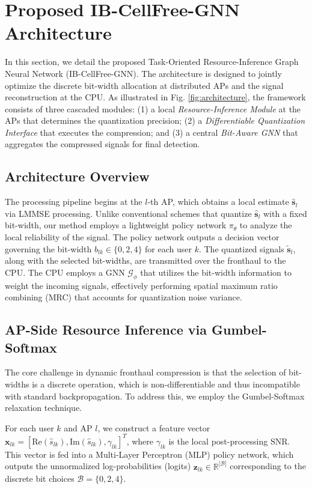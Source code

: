 \section{Proposed IB-CellFree-GNN Architecture}

In this section, we detail the proposed Task-Oriented Resource-Inference Graph Neural Network (IB-CellFree-GNN). The architecture is designed to jointly optimize the discrete bit-width allocation at distributed APs and the signal reconstruction at the CPU. As illustrated in Fig. \ref{fig:architecture}, the framework consists of three cascaded modules: (1) a local \textit{Resource-Inference Module} at the APs that determines the quantization precision; (2) a \textit{Differentiable Quantization Interface} that executes the compression; and (3) a central \textit{Bit-Aware GNN} that aggregates the compressed signals for final detection.

\subsection{Architecture Overview}
The processing pipeline begins at the $l$-th AP, which obtains a local estimate $\hat{\mathbf{s}}_l$ via LMMSE processing. Unlike conventional schemes that quantize $\hat{\mathbf{s}}_l$ with a fixed bit-width, our method employs a lightweight policy network $\pi_{\theta}$ to analyze the local reliability of the signal. The policy network outputs a decision vector governing the bit-width $b_{lk} \in \{0, 2, 4\}$ for each user $k$. The quantized signals $\tilde{\mathbf{s}}_l$, along with the selected bit-widths, are transmitted over the fronthaul to the CPU. The CPU employs a GNN $\mathcal{G}_{\phi}$ that utilizes the bit-width information to weight the incoming signals, effectively performing spatial maximum ratio combining (MRC) that accounts for quantization noise variance.

\subsection{AP-Side Resource Inference via Gumbel-Softmax}
The core challenge in dynamic fronthaul compression is that the selection of bit-widths is a discrete operation, which is non-differentiable and thus incompatible with standard backpropagation. To address this, we employ the Gumbel-Softmax relaxation technique.

For each user $k$ and AP $l$, we construct a feature vector $\mathbf{x}_{lk} = [\text{Re}(\hat{s}_{lk}), \text{Im}(\hat{s}_{lk}), \gamma_{lk}]^T$, where $\gamma_{lk}$ is the local post-processing SNR. This vector is fed into a Multi-Layer Perceptron (MLP) policy network, which outputs the unnormalized log-probabilities (logits) $\mathbf{z}_{lk} \in \mathbb{R}^{|\mathcal{B}|}$ corresponding to the discrete bit choices $\mathcal{B} = \{0, 2, 4\}$.

